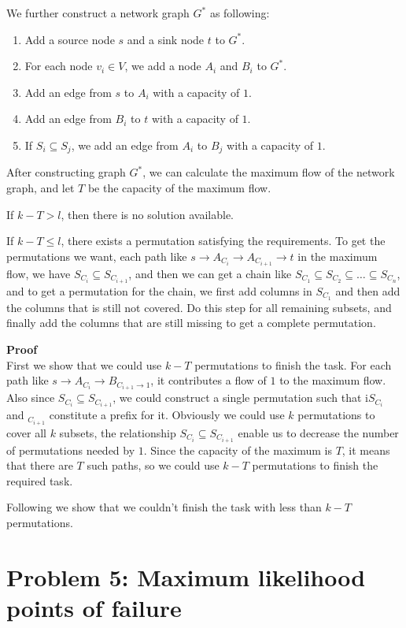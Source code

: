 \documentclass{article}
\newcommand{\Proof}{\vspace{0.3cm} \noindent\textbf{Proof} \\}
\begin{document}
We further construct a network graph $G^*$ as following:
\begin{enumerate}
  \item Add a source node $s$ and a sink node $t$ to $G^*$.
  \item For each node $v_i \in V$, we add a node $A_i$ and $B_i$ to $G^*$.
  \item Add an edge from $s$ to $A_i$ with a capacity of $1$.  
  \item Add an edge from $B_i$ to $t$ with a capacity of $1$.
  \item If $S_i \subseteq S_j$, we add an edge from $A_i$ to $B_j$ with a capacity of $1$.   
\end{enumerate}

After constructing graph $G^*$, we can calculate the maximum flow of the network graph, and let $T$
be the capacity of the maximum flow. 

If $k - T > l$, then there is no solution available. 

If $k-T \leq l$, there exists a permutation satisfying the requirements. To get the permutations we
want, each path like $s \rightarrow A_{C_i} \rightarrow A_{C_{i+1}} \rightarrow t$ in the maximum
flow, we have $S_{C_i} \subseteq S_{C_{i+1}}$, and then we can get a chain like $S_{C_{1}} \subseteq
S_{C_2} \subseteq \dots \subseteq S_{C_n}$, and to get a permutation for the chain, we first add
columns in $S_{C_1}$ and then add the columns that is still not covered. Do this step for all
remaining subsets, and finally add the columns that are still missing to get a complete permutation.          


\Proof
First we show that we could use $k-T$ permutations to finish the task. For each path like $s
\rightarrow A_{C_i} \rightarrow B_{C_{i+1} \rightarrow 1}$, it contributes a flow of $1$ to the
maximum flow. Also since $S_{C_i} \subseteq S_{C_{i+1}}$, we could construct a single permutation
such that i$S_{C_i}$ and $_{C_{i+1}}$ constitute a prefix for it. Obviously we could use $k$
permutations to cover all $k$ subsets, the relationship $S_{C_i} \subseteq S_{C_{i+1}}$ enable us to
decrease the number of permutations needed by $1$. Since the capacity of the maximum is $T$, it
means that there are $T$ such paths, so we could use $k-T$ permutations to finish the required task.

Following we show that we couldn't finish the task with less than $k-T$ permutations.   

\section*{Problem 5: Maximum likelihood points of failure}
\end{document}
